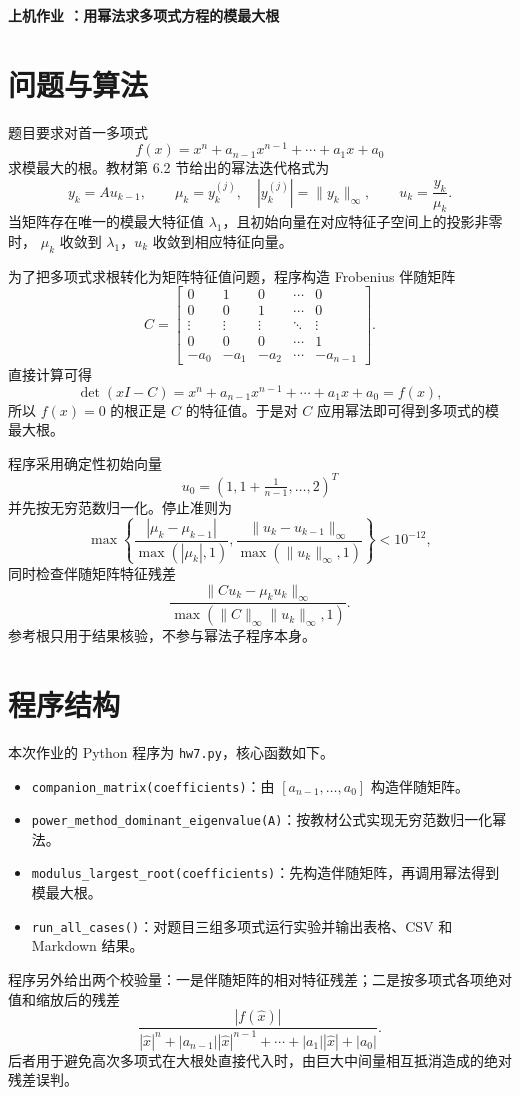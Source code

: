 \documentclass[a4paper,11pt]{article}
\begin{document}
\begin{center}
    \Large\textbf{上机作业 ：用幂法求多项式方程的模最大根}
\end{center}

\section{问题与算法}
题目要求对首一多项式
\[
    f(x)=x^n+a_{n-1}x^{n-1}+\cdots+a_1x+a_0
\]
求模最大的根。教材第 6.2 节给出的幂法迭代格式为
\[
    y_k=Au_{k-1},\qquad
    \mu_k=y_k^{(j)},\quad |y_k^{(j)}|=\|y_k\|_\infty,\qquad
    u_k=\frac{y_k}{\mu_k}.
\]
当矩阵存在唯一的模最大特征值 $\lambda_1$，且初始向量在对应特征子空间上的投影非零时，
$\mu_k$ 收敛到 $\lambda_1$，$u_k$ 收敛到相应特征向量。

为了把多项式求根转化为矩阵特征值问题，程序构造 Frobenius 伴随矩阵
\[
    C=
    \begin{bmatrix}
    0&1&0&\cdots&0\\
    0&0&1&\cdots&0\\
    \vdots&\vdots&\vdots&\ddots&\vdots\\
    0&0&0&\cdots&1\\
    -a_0&-a_1&-a_2&\cdots&-a_{n-1}
    \end{bmatrix}.
\]
直接计算可得
\[
    \det(xI-C)=x^n+a_{n-1}x^{n-1}+\cdots+a_1x+a_0=f(x),
\]
所以 $f(x)=0$ 的根正是 $C$ 的特征值。于是对 $C$ 应用幂法即可得到多项式的模最大根。

程序采用确定性初始向量
\[
    u_0=(1,1+\tfrac1{n-1},\ldots,2)^T
\]
并先按无穷范数归一化。停止准则为
\[
    \max\left\{
    \frac{|\mu_k-\mu_{k-1}|}{\max(|\mu_k|,1)},
    \frac{\|u_k-u_{k-1}\|_\infty}{\max(\|u_k\|_\infty,1)}
    \right\}<10^{-12},
\]
同时检查伴随矩阵特征残差
\[
    \frac{\|Cu_k-\mu_k u_k\|_\infty}
    {\max(\|C\|_\infty\|u_k\|_\infty,1)}.
\]
参考根只用于结果核验，不参与幂法子程序本身。

\section{程序结构}
本次作业的 Python 程序为 \verb|hw7.py|，核心函数如下。
\begin{itemize}
    \item \verb|companion_matrix(coefficients)|：由 $[a_{n-1},\ldots,a_0]$ 构造伴随矩阵。
    \item \verb|power_method_dominant_eigenvalue(A)|：按教材公式实现无穷范数归一化幂法。
    \item \verb|modulus_largest_root(coefficients)|：先构造伴随矩阵，再调用幂法得到模最大根。
    \item \verb|run_all_cases()|：对题目三组多项式运行实验并输出表格、CSV 和 Markdown 结果。
\end{itemize}
程序另外给出两个校验量：一是伴随矩阵的相对特征残差；二是按多项式各项绝对值和缩放后的残差
\[
    \frac{|f(\hat x)|}
    {|\hat x|^n+|a_{n-1}||\hat x|^{n-1}+\cdots+|a_1||\hat x|+|a_0|}.
\]
后者用于避免高次多项式在大根处直接代入时，由巨大中间量相互抵消造成的绝对残差误判。
\end{document}
